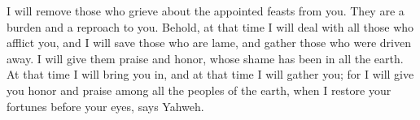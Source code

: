 {I will remove those who grieve about the appointed feasts from you. They are a burden and a reproach to you.
Behold, at that time I will deal with all those who afflict you, and I will save those who are lame, and gather those who were driven away. I will give them praise and honor, whose shame has been in all the earth.
At that time I will bring you in, and at that time I will gather you; for I will give you honor and praise among all the peoples of the earth, when I restore your fortunes before your eyes, says Yahweh.
\par }
